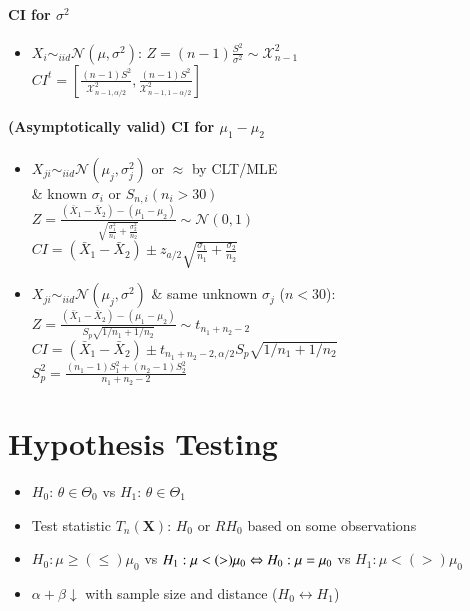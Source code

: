 \documentclass[paper=a4,fontsize=8pt,pagesize,DIV=calc]{scrartcl}
\newcounter{row}
\begin{document}
\begin{multicols}{3}
\paragraph{CI for $\sigma^2$}
\begin{itemize}
\item $X_i\sim_{iid}\mathcal{N}(\mu,\sigma^2)$: $Z=(n-1)\frac{S^2}{\sigma^2}\sim \mathcal{X}^2_{n-1}$\\
$CI^t=\left[\frac{(n-1)S^2}{\mathcal{X}^2_{n-1,\alpha/2}},\frac{(n-1)S^2}{\mathcal{X}^2_{n-1,1-\alpha/2}}\right]$
\end{itemize}
\paragraph{(Asymptotically valid) CI for $\mu_1-\mu_2$}
\begin{itemize}
\item $X_{ji}\sim_{iid}\mathcal{N}(\mu_j,\sigma_j^2)$ or $\approx$ by CLT/MLE \\ \& known $\sigma_i$ or $S_{n,i} (n_i>30)$ \\
$Z=\frac{(\bar{X}_1-\bar{X}_2)-(\mu_1-\mu_2)}{\sqrt{\frac{\sigma_1^2}{n_1}+\frac{\sigma_2^2}{n_2}}}\sim \mathcal{N}(0,1)$\\ 
$CI=(\bar{X}_1-\bar{X}_2)\pm z_{a/2}\sqrt{\frac{\sigma_1}{n_1}+\frac{\sigma_2}{n_2}}$
\item $X_{ji}\sim_{iid}\mathcal{N}(\mu_j,\sigma^2)$ \& same unknown $\sigma_j$ ($n<30$): \\
$Z=\frac{(\bar{X}_1-\bar{X}_2)-(\mu_1-\mu_2)}{S_p\sqrt{1/n_1+1/n_2}}\sim t_{n_1+n_2-2}$\\ 
$CI=(\bar{X}_1-\bar{X}_2)\pm t_{n_1+n_2-2,\alpha/2}S_p\sqrt{1/n_1+1/n_2}$\\
$S_p^2=\frac{(n_1-1)S_1^2+(n_2-1)S_2^2}{n_1+n_2-2}$
\end{itemize}
\section{Hypothesis Testing}
\begin{itemize}
\item $H_0$: $\theta\in\Theta_0$ vs $H_1$: $\theta\in\Theta_1$
\item Test statistic $T_n(\textbf{X})$: $H_0$ or $RH_0$ based on some observations 
\item $H_0: \mu \geq(\leq) \mu_0$ vs $H_1: \mu <(>) \mu_0 \\ \Leftrightarrow H_0: \mu=\mu_0$ vs $H_1: \mu <(>) \mu_0$
\item $\alpha + \beta \downarrow$ with sample size and distance ($H_0 \leftrightarrow H_1$)
\end{itemize} 

\end{multicols}
\end{document}
